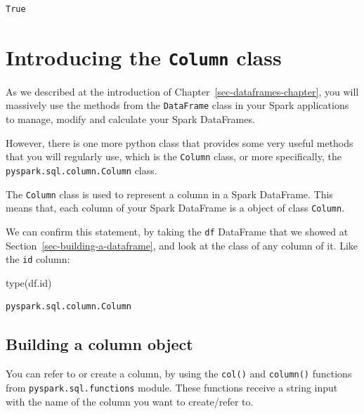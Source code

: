 \documentclass[
  11pt,
  letterpaper,
  DIV=11,
  numbers=noendperiod]{scrreprt}
\newenvironment{Shaded}{\begin{snugshade}}{\end{snugshade}}
\newcommand{\BuiltInTok}[1]{\textcolor[rgb]{0.00,0.23,0.31}{#1}}
\newcommand{\NormalTok}[1]{\textcolor[rgb]{0.00,0.23,0.31}{#1}}
\begin{document}
\begin{verbatim}
True
\end{verbatim}


\hypertarget{introducing-the-column-class}{%
\chapter{\texorpdfstring{Introducing the \texttt{Column}
class}{Introducing the Column class}}\label{introducing-the-column-class}}

As we described at the introduction of
Chapter~\ref{sec-dataframes-chapter}, you will massively use the methods
from the \texttt{DataFrame} class in your Spark applications to manage,
modify and calculate your Spark DataFrames.

However, there is one more python class that provides some very useful
methods that you will regularly use, which is the \texttt{Column} class,
or more specifically, the \texttt{pyspark.sql.column.Column} class.

The \texttt{Column} class is used to represent a column in a Spark
DataFrame. This means that, each column of your Spark DataFrame is a
object of class \texttt{Column}.

We can confirm this statement, by taking the \texttt{df} DataFrame that
we showed at Section~\ref{sec-building-a-dataframe}, and look at the
class of any column of it. Like the \texttt{id} column:

\begin{Shaded}
\begin{Highlighting}[]
\BuiltInTok{type}\NormalTok{(df.}\BuiltInTok{id}\NormalTok{)}
\end{Highlighting}
\end{Shaded}

\begin{verbatim}
pyspark.sql.column.Column
\end{verbatim}

\hypertarget{building-a-column-object}{%
\section{Building a column object}\label{building-a-column-object}}

You can refer to or create a column, by using the \texttt{col()} and
\texttt{column()} functions from \texttt{pyspark.sql.functions} module.
These functions receive a string input with the name of the column you
want to create/refer to.
\end{document}
